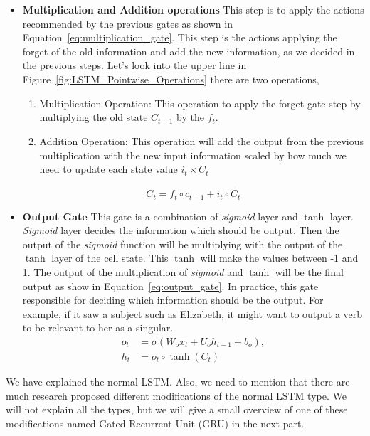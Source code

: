 \begin{itemize}
\item \textbf{Multiplication and Addition operations} This step is to apply the actions recommended by the previous gates as shown in Equation~\eqref{eq:multiplication_gate}. This step is the actions applying the forget of the old information and add the new information, as we decided in the previous steps. Let's look into the upper line in Figure~\ref{fig:LSTM_Pointwise_Operations} there are two operations, 
  \begin{enumerate}
  \item Multiplication Operation: This operation to apply the forget gate step by multiplying the old state $\tilde{C}_{t-1} $ by the $f_t$.
  \item Addition Operation: This operation will add the output from the previous multiplication with the new input information scaled by how much we need to update each state value $i_t \times \tilde{C_t}$
    \end{enumerate}%
\begin{equation}\label{eq:multiplication_gate}
C_t  = f_t \circ c_{t-1} + i_t \circ \widetilde{C_t}
\end{equation}
      
    \item \textbf{Output Gate} This gate is a combination of \textit{sigmoid} layer and \textit{$\tanh$} layer. \textit{Sigmoid} layer decides the information which should be output. Then the output of the  \textit{sigmoid} function will be multiplying with the output of the \textit{$\tanh$} layer of the cell state. This \textit{$\tanh$} will make the values between -1 and 1. The output of the multiplication of \textit{sigmoid} and \textit{$\tanh$} will be the final output as show in Equation~\eqref{eq:output_gate}. In practice, this gate responsible for deciding which information should be the output. For example, if it saw a subject such as Elizabeth, it might want to output a verb to be relevant to her as a singular.%
\begin{subequations}\label{eq:output_gate}
\begin{align}
o_t  &= \sigma(W_o  x_t + U_o h_{t-1} + b_o),\\
h_t  &= o_t \circ \tanh(C_t)
\end{align}
\end{subequations}%
\end{itemize}

    We have explained the normal LSTM. Also, we need to mention that there are much research proposed different modifications of the normal LSTM type. We will not explain all the types, but we will give a small overview of one of these modifications named Gated Recurrent Unit (GRU) in the next part.

